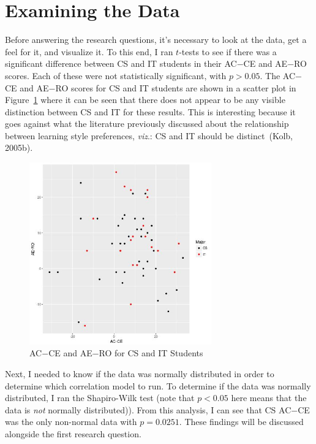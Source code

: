 \section{Examining the Data}
Before answering the research questions, it's necessary to look at the data, get a feel for it, and visualize it. To this end, I ran $t$-tests to see if there was a significant difference between CS and IT students in their AC$-$CE and AE$-$RO scores. Each of these were not statistically significant, with $p>0.05$. The AC$-$CE and AE$-$RO scores for CS and IT students are shown in a scatter plot in Figure~\ref{fig:c-cs-v-it-plot} where it can be seen that there does not appear to be any visible distinction between CS and IT for these results. This is interesting because it goes against what the literature previously discussed about the relationship between learning style preferences, \textit{viz}.: CS and IT should be distinct~(Kolb, 2005b).

\begin{figure}[!bhtb]
  \centering
  \includegraphics[width=0.7\textwidth]{figures/chapter4/cs-v-it-plot.jpg}
  \caption[AC$-$CE and AE$-$RO for CS and IT Students]{AC$-$CE and AE$-$RO for CS and IT Students}
  \label{fig:c-cs-v-it-plot}
\end{figure}

Next, I needed to know if the data was normally distributed in order to determine which correlation model to run. To determine if the data was normally distributed, I ran the Shapiro-Wilk test (note that $p<0.05$ here means that the data is \emph{not} normally distributed)). From this analysis, I can see that CS AC$-$CE was the only non-normal data with $p=0.0251$. These findings will be discussed alongside the first research question.

